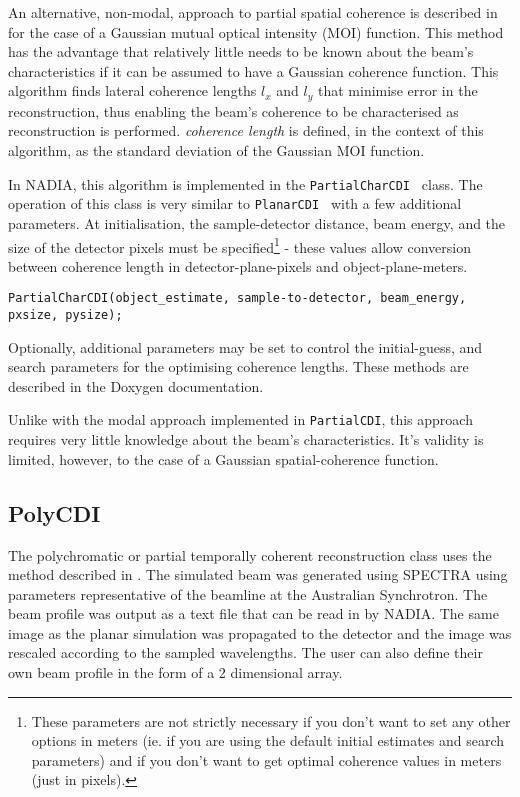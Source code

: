 \documentclass[]{nadia}
\def\name{NADIA}
\begin{document}
      
An alternative, non-modal, approach to partial spatial coherence is described in \cite{gaussianCharacterisation} for the case of a Gaussian mutual optical intensity (MOI) function. This method has the advantage that relatively little needs to be known about the beam's characteristics if it can be assumed to have a Gaussian coherence function. This algorithm finds lateral coherence lengths $l_x$ and $l_y$ that minimise error in the reconstruction, thus enabling the beam's coherence to be characterised as reconstruction is performed. {\em coherence length} is defined, in the context of this algorithm, as the standard deviation of the Gaussian MOI function.

In \name, this algorithm is implemented in the {\tt PartialCharCDI } class. The operation of this class is very similar to { \tt PlanarCDI } with a few additional parameters. At initialisation, the sample-detector distance, beam energy, and the size of the detector pixels must be specified\footnote{These parameters are not strictly necessary if you don't want to set any other options in meters (ie. if you are using the default initial estimates and search parameters) and if you don't want to get optimal coherence values in meters (just in pixels).} - these values allow conversion between coherence length in detector-plane-pixels and object-plane-meters.

\begin{verbatim}
PartialCharCDI(object_estimate, sample-to-detector, beam_energy, pxsize, pysize);
\end{verbatim}

Optionally, additional parameters may be set to control the initial-guess, and search parameters for the optimising coherence lengths. These methods are described in the Doxygen documentation.

Unlike with the modal approach implemented in {\tt PartialCDI}, this approach requires very little knowledge about the beam's characteristics. It's validity is limited, however, to the case of a Gaussian spatial-coherence function.\\

\subsection{PolyCDI}


The polychromatic or partial temporally coherent reconstruction  class uses the method described in \cite{6198103420110701}. The simulated beam was generated using SPECTRA \cite{spectra} using parameters
representative of the beamline at the Australian Synchrotron. The beam profile was output as a text file that 
can be read in by \name. The same image as the planar simulation was propagated to the detector and the image was rescaled according to the sampled wavelengths. The user can also define their own beam profile in the form of a 2 dimensional array.\\
\end{document}
